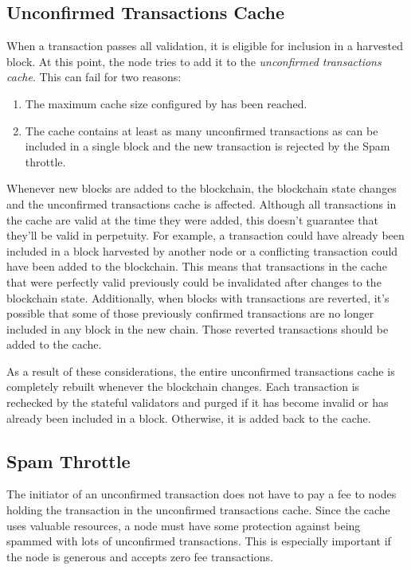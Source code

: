 \subsection{Unconfirmed Transactions Cache}

When a transaction passes all validation, it is eligible for inclusion in a harvested block.
At this point, the node tries to add it to the \emph{unconfirmed transactions cache}.
This can fail for two reasons:
\begin{enumerate}
	\item{The maximum cache size configured by  has been reached.}
	\item{The cache contains at least as many unconfirmed transactions as can be included in a single block and the new transaction is rejected by the Spam throttle}.
\end{enumerate}

Whenever new blocks are added to the blockchain, the blockchain state changes and the unconfirmed transactions cache is affected.
Although all transactions in the cache are valid at the time they were added, this doesn't guarantee that they'll be valid in perpetuity.
For example, a transaction could have already been included in a block harvested by another node or a conflicting transaction could have been added to the blockchain.
This means that transactions in the cache that were perfectly valid previously could be invalidated after changes to the blockchain state.
Additionally, when blocks with transactions are reverted, it's possible that some of those previously confirmed transactions are no longer included in any block in the new chain.
Those reverted transactions should be added to the cache.

As a result of these considerations, the entire unconfirmed transactions cache is completely rebuilt whenever the blockchain changes.
Each transaction is rechecked by the stateful validators and purged if it has become invalid or has already been included in a block.
Otherwise, it is added back to the cache.

\subsection{Spam Throttle}

The initiator of an unconfirmed transaction does not have to pay a fee to nodes holding the transaction in the unconfirmed transactions cache.
Since the cache uses valuable resources, a node must have some protection against being spammed with lots of unconfirmed transactions.
This is especially important if the node is generous and accepts zero fee transactions.

